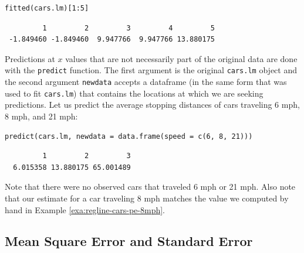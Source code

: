 \documentclass[captions=tableheading]{scrbook}
\begin{document}
\begin{verbatim}
fitted(cars.lm)[1:5]
\end{verbatim}

\begin{verbatim}
         1         2         3         4         5 
 -1.849460 -1.849460  9.947766  9.947766 13.880175
\end{verbatim}

Predictions at \(x\) values that are not necessarily part of the original data are done with the \texttt{predict} function. The first argument is the original \texttt{cars.lm} object and the second argument \texttt{newdata} accepts a dataframe (in the same form that was used to fit \texttt{cars.lm}) that contains the locations at which we are seeking predictions. Let us predict the average stopping distances of cars traveling 6 mph, 8 mph, and 21 mph:


\begin{verbatim}
predict(cars.lm, newdata = data.frame(speed = c(6, 8, 21)))
\end{verbatim}

\begin{verbatim}
         1         2         3 
  6.015358 13.880175 65.001489
\end{verbatim}

Note that there were no observed cars that traveled 6 mph or 21 mph. Also note that our estimate for a car traveling 8 mph matches the value we computed by hand in Example \ref{exa:regline-cars-pe-8mph}.
\subsection{Mean Square Error and Standard Error}
\label{sec-11-2-3}
\end{document}
